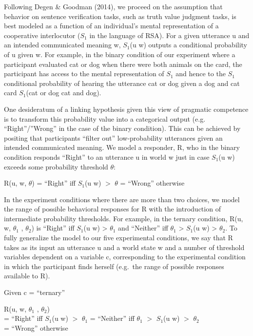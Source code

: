 \documentclass[floatsintext,man]{apa6}
\theoremstyle{definition}
\theoremstyle{definition}
\theoremstyle{definition}
\theoremstyle{remark}
\begin{document}
Following Degen \& Goodman (2014), we proceed on the assumption that
behavior on sentence verification tasks, such as truth value judgment
tasks, is best modeled as a function of an individual's mental
representation of a cooperative interlocutor (\(S_1\) in the language of
RSA). For a given utterance u and an intended communicated meaning w,
\(S_1\)(u \textbar{} w) outputs a conditional probability of u given w.
For example, in the binary condition of our experiment where a
participant evaluated cat or dog when there were both animals on the
card, the participant has access to the mental representation of \(S_1\)
and hence to the \(S_1\) conditional probability of hearing the
utterance cat or dog given a dog and cat card \(S_1\)(cat or dog
\textbar{} cat and dog).

One desideratum of a linking hypothesis given this view of pragmatic
competence is to transform this probability value into a categorical
output (e.g. \enquote{Right}/''Wrong'' in the case of the binary
condition). This can be achieved by positing that participants
\enquote{filter out} low-probability utterances given an intended
communicated meaning. We model a responder, R, who in the binary
condition responds \enquote{Right} to an utterance u in world w just in
case \(S_1\)(u \textbar{} w) exceeds some probability threshold
\(\theta\):

R(u, w, \(\theta\)) = \enquote{Right} iff \(S_1\)(u \textbar{} w) \(>\)
\(\theta\) = \enquote{Wrong} otherwise

In the experiment conditions where there are more than two choices, we
model the range of possible behavioral responses for R with the
introduction of intermediate probability thresholds. For example, in the
ternary condition, R(u, w, \(\theta_1\) , \(\theta_2\)) is
\enquote{Right} iff \(S_1\)(u \textbar{} w) \textgreater{} \(\theta_1\)
and \enquote{Neither} iff \(\theta_1\) \textgreater{} \(S_1\)(u
\textbar{} w) \textgreater{} \(\theta_2\). To fully generalize the model
to our five experimental conditions, we say that R takes as its input an
utterance u and a world state w and a number of threshold variables
dependent on a variable c, corresponding to the experimental condition
in which the participant finds herself (e.g.~the range of possible
responses available to R).

Given c = \enquote{ternary}

R(u, w, \(\theta_1\) , \(\theta_2\))\\
= \enquote{Right} iff \(S_1\)(u \textbar{} w) \(>\) \(\theta_1\) =
\enquote{Neither} iff \(\theta_1\) \(>\) \(S_1\)(u \textbar{} w) \(>\)
\(\theta_2\)\\
= \enquote{Wrong} otherwise
\end{document}
